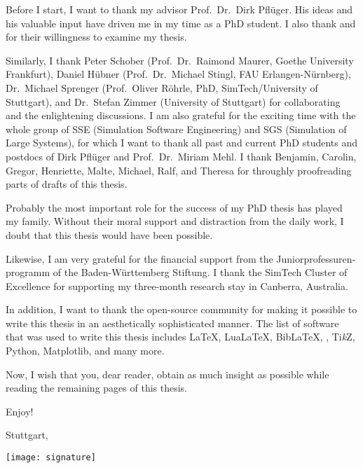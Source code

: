 
Before I start, I want to thank my advisor Prof.\ Dr.\ Dirk Pflüger.
His ideas and his valuable input have driven me in
my time as a PhD student.
I also thank \theexamineri{} and \theexaminerii{}
for their willingness to examine my thesis.

Similarly, I thank
Peter Schober
(Prof.\ Dr.\ Raimond Maurer, Goethe University Frankfurt),
Daniel Hübner
(Prof.\ Dr.\ Michael Stingl, FAU Erlangen-Nürnberg),
Dr.\ Michael Sprenger
(Prof.\ Oliver Röhrle, PhD, SimTech/University of Stuttgart), and
Dr.\ Stefan Zimmer
(University of Stuttgart) for
collaborating and the enlightening discussions.
I am also grateful for the exciting time with the whole group of
SSE (Simulation Software Engineering) and
SGS (Simulation of Large Systems),
for which I want to thank all past and current PhD students and postdocs of
Dirk Pflüger and Prof.\ Dr.\ Miriam Mehl.
I thank Benjamin, Carolin, Gregor, Henriette, Malte, Michael, Ralf, and Theresa
for throughly proofreading parts of drafts of this thesis.

Probably the most important role for the success of my PhD thesis
has played my family.
Without their moral support and distraction from the daily work,
I doubt that this thesis would have been possible.

Likewise, I am very grateful for the financial support from
the \foreignlanguage{ngerman}{Juniorprofessurenprogramm} of the
\foreignlanguage{ngerman}{Baden-Württemberg Stiftung}.
I thank the SimTech Cluster of Excellence for supporting
my three-month research stay in Canberra, Australia.

In addition, I want to thank the open-source community for making it possible to
write this thesis in an aesthetically sophisticated manner.
The list of software that was used to write this thesis includes
\LaTeX, Lua\LaTeX, Bib\LaTeX,
\scalebox{0.9}{\KOMAScript}, Ti\emph{k}Z, Python, Matplotlib,
and many more.

\label{page:preface}
Now, I wish that you, dear reader, obtain as much insight as possible
while reading the remaining
 pages of this thesis.

Enjoy!

\vspace{1em}

\noindent
Stuttgart, \thedate

\vspace{0.5em}

\noindent
\texttt{[image: signature]}

\cleardoublepage
